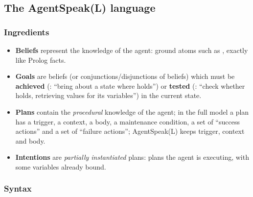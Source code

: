 \subsection{The AgentSpeak(L) language}
\label{sec:agentspeak-language}

\subsubsection{Ingredients}

\begin{itemize}[nosep]
  \item \textbf{Beliefs} represent the knowledge of the agent: ground atoms such as
        , exactly like Prolog facts.
  \item \textbf{Goals} are beliefs (or conjunctions/disjunctions of beliefs) which must be
        \textbf{achieved} (: ``bring about a state where  holds'') or
        \textbf{tested} (: ``check whether  holds, retrieving values for
        its variables'') in the current state.
  \item \textbf{Plans} contain the \emph{procedural} knowledge of the agent; in the full
        model a plan has a trigger, a context, a body, a maintenance condition, a set of
        ``success actions'' and a set of ``failure actions''; AgentSpeak(L) keeps trigger,
        context and body.
  \item \textbf{Intentions} are \emph{partially instantiated} plans: plans the agent is
        executing, with some variables already bound.
\end{itemize}

\subsubsection{Syntax}

